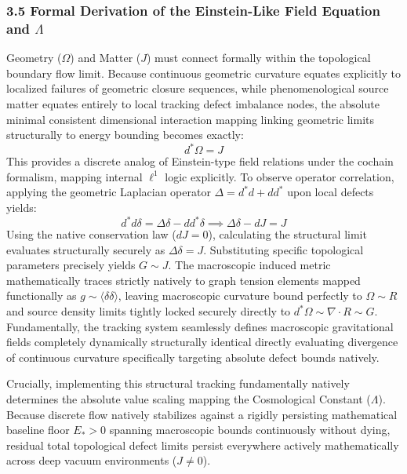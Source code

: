 \documentclass[
]{article}
\begin{document}
\subsubsection{\texorpdfstring{3.5 Formal Derivation of the
Einstein-Like Field Equation and
\(\Lambda\)}{3.5 Formal Derivation of the Einstein-Like Field Equation and \textbackslash Lambda}}\label{formal-derivation-of-the-einstein-like-field-equation-and-lambda}

Geometry (\(\Omega\)) and Matter (\(J\)) must connect formally within
the topological boundary flow limit. Because continuous geometric
curvature equates explicitly to localized failures of geometric closure
sequences, while phenomenological source matter equates entirely to
local tracking defect imbalance nodes, the absolute minimal consistent
dimensional interaction mapping linking geometric limits structurally to
energy bounding becomes exactly: \[ d^*\Omega = J \] This provides a
discrete analog of Einstein-type field relations under the cochain
formalism, mapping internal \(\ell^1\) logic explicitly. To observe
operator correlation, applying the geometric Laplacian operator
\(\Delta = d^*d + dd^*\) upon local defects yields:
\[ d^*d\delta = \Delta\delta - dd^*\delta \implies \Delta\delta - dJ = J \]
Using the native conservation law (\(dJ = 0\)), calculating the
structural limit evaluates structurally securely as
\(\Delta\delta = J\). Substituting specific topological parameters
precisely yields \(G \sim J\). The macroscopic induced metric
mathematically traces strictly natively to graph tension elements mapped
functionally as \(g \sim \langle\delta \delta\rangle\), leaving
macroscopic curvature bound perfectly to \(\Omega \sim R\) and source
density limits tightly locked securely directly to
\(d^*\Omega \sim \nabla \cdot R \sim G\). Fundamentally, the tracking
system seamlessly defines macroscopic gravitational fields completely
dynamically structurally identical directly evaluating divergence of
continuous curvature specifically targeting absolute defect bounds
natively.

Crucially, implementing this structural tracking fundamentally natively
determines the absolute value scaling mapping the Cosmological Constant
(\(\Lambda\)). Because discrete flow natively stabilizes against a
rigidly persisting mathematical baseline floor \(E_* > 0\) spanning
macroscopic bounds continuously without dying, residual total
topological defect limits persist everywhere actively mathematically
across deep vacuum environments (\(J \neq 0\)).
\end{document}
